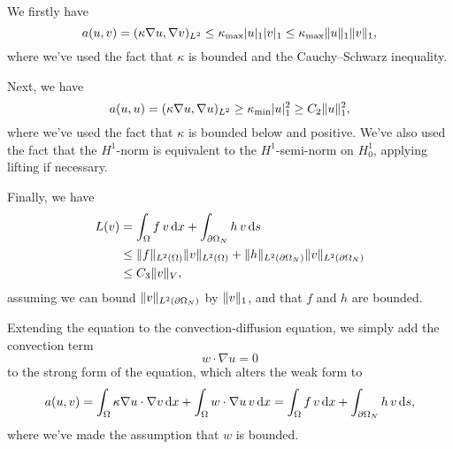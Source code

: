 We firstly have
\begin{equation}
    a(u, v) = (\kappa \nabla u, \nabla v)_{L^2} \leq \kappa_{\max} \lvert u\rvert_1 \lvert v\rvert_1 \leq \kappa_{\max} \lVert u\rVert_1 \lVert v\rVert_1,
\end{equation}
where we've used the fact that $\kappa$ is bounded and the Cauchy--Schwarz inequality. %

Next, we have
\begin{equation}
    a(u, u) = (\kappa \nabla u, \nabla u)_{L^2} \geq \kappa_{\min} \lvert u\rvert_1^2 \geq C_2 \lVert u\rVert_1^2,
\end{equation}
where we've used the fact that $\kappa$ is bounded below and positive.
We've also used the fact that the $H^1$-norm is equivalent to the $H^1$-semi-norm on $H^1_0$, applying lifting if necessary.

Finally, we have
\begin{align*}
    L(v) &= \int_{\Omega} f \, v \mathop{}\!\mathrm{d} x + \int_{\partial\Omega_N} h \, v \mathop{}\!\mathrm{d} s \\
    &\leq \lVert f\rVert_{L^2(\Omega)} \lVert v\rVert_{L^2(\Omega)} + \lVert h\rVert_{L^2(\partial\Omega_N)} \lVert v\rVert_{L^2(\partial\Omega_N)} \\
    &\leq C_3 \lVert v\rVert_V,
\end{align*}
assuming we can bound $\lVert v\rVert_{L^2(\partial\Omega_N)}$ by $\lVert v\rVert_1$, and that $f$ and $h$ are bounded.

Extending the equation to the convection-diffusion equation, we simply add the convection term
\begin{equation}
    w \cdot \nabla u = 0
\end{equation}
to the strong form of the equation, which alters the weak form to
\begin{equation}
    a(u, v) = \int_{\Omega} \kappa \nabla u \cdot \nabla v \mathop{}\!\mathrm{d} x + \int_{\Omega} w \cdot \nabla u\, v \mathop{}\!\mathrm{d} x = \int_{\Omega} f \, v \mathop{}\!\mathrm{d} x + \int_{\partial\Omega_N} h \, v \mathop{}\!\mathrm{d} s,
\end{equation}
where we've made the assumption that $w$ is bounded.

